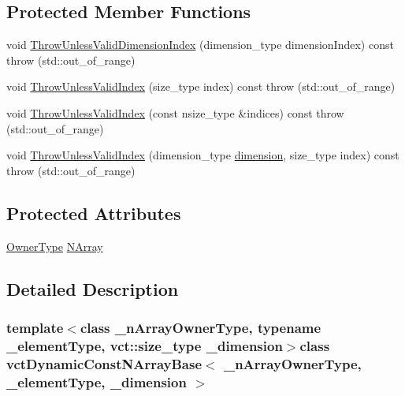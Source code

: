 \subsection*{Protected Member Functions}
\begin{DoxyCompactItemize}
\item 
void \hyperlink{classvct_dynamic_const_n_array_base_aa013dfd6230be4f7fc869c1daf7515d3}{Throw\+Unless\+Valid\+Dimension\+Index} (dimension\+\_\+type dimension\+Index) const   throw (std\+::out\+\_\+of\+\_\+range)
\item 
void \hyperlink{classvct_dynamic_const_n_array_base_ad6647ba0b75ea6f4a193a1875e2f889e}{Throw\+Unless\+Valid\+Index} (size\+\_\+type index) const   throw (std\+::out\+\_\+of\+\_\+range)
\item 
void \hyperlink{classvct_dynamic_const_n_array_base_a6839a681cfa524a736063cdda00ac1ca}{Throw\+Unless\+Valid\+Index} (const nsize\+\_\+type \&indices) const   throw (std\+::out\+\_\+of\+\_\+range)
\item 
void \hyperlink{classvct_dynamic_const_n_array_base_a58d91c9a444c8af1f9705c319976eafd}{Throw\+Unless\+Valid\+Index} (dimension\+\_\+type \hyperlink{classvct_dynamic_const_n_array_base_aad976ad48dc9b1006d9e2729195f0b7c}{dimension}, size\+\_\+type index) const   throw (std\+::out\+\_\+of\+\_\+range)
\end{DoxyCompactItemize}
\subsection*{Protected Attributes}
\begin{DoxyCompactItemize}
\item 
\hyperlink{classvct_dynamic_const_n_array_base_aad4328d01dc43be4b9047d594ed2ae8d}{Owner\+Type} \hyperlink{classvct_dynamic_const_n_array_base_abab29addf55644fbec7540399d586874}{N\+Array}
\end{DoxyCompactItemize}


\subsection{Detailed Description}
\subsubsection*{template$<$class \+\_\+n\+Array\+Owner\+Type, typename \+\_\+element\+Type, vct\+::size\+\_\+type \+\_\+dimension$>$class vct\+Dynamic\+Const\+N\+Array\+Base$<$ \+\_\+n\+Array\+Owner\+Type, \+\_\+element\+Type, \+\_\+dimension $>$}

